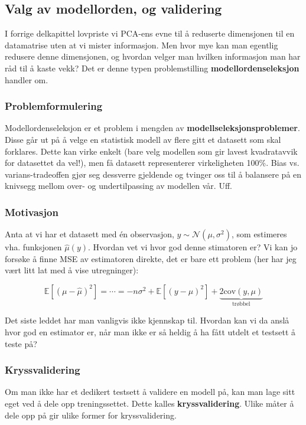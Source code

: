 \subsection{Valg av modellorden, og validering}
I forrige delkapittel lovpriste vi PCA-ens evne til å reduserte dimensjonen til en datamatrise uten at vi mister informasjon. Men hvor mye kan man egentlig redusere denne dimensjonen, og hvordan velger man hvilken informasjon man har råd til å kaste vekk? Det er denne typen problemstilling \textbf{modellordenseleksjon} handler om.

\subsubsection{Problemformulering}
Modellordenseleksjon er et problem i mengden av \textbf{modellseleksjonsproblemer}. Disse går ut på å velge en statistisk modell av flere gitt et datasett som skal forklares. Dette kan virke enkelt (bare velg modellen som gir lavest kvadratavvik for datasettet da vel!), men få datasett representerer virkeligheten 100\%. Bias vs. varians-tradeoffen gjør seg dessverre gjeldende og tvinger oss til å balansere på en knivsegg mellom over- og undertilpassing av modellen vår. Uff.

\subsubsection{Motivasjon}
Anta at vi har et datasett med én observasjon, $y \sim \mathcal{N}(\mu, \sigma^2)$, som estimeres vha. funksjonen $\hat{\mu} (y)$. Hvordan vet vi hvor god denne stimatoren er? Vi kan jo forsøke å finne MSE av estimatoren direkte, det er bare ett problem (her har jeg vært litt lat med å vise utregninger):

\begin{equation}
\mathbb{E} [(\mu - \hat{\mu})^2] = \cdots = -n \sigma^2 + \mathbb{E} [(y - \mu)^2] + \underbrace{2 \textrm{cov}(y, \mu)}_{\textrm{trøbbel}}
\end{equation}

Det siste leddet har man vanligvis ikke kjennskap til. Hvordan kan vi da anslå hvor god en estimator er, når man ikke er så heldig å ha fått utdelt et testsett å teste på?

\subsubsection{Kryssvalidering}
Om man ikke har et dedikert testsett å validere en modell på, kan man lage sitt eget ved å dele opp treningssettet. Dette kalles \textbf{kryssvalidering}. Ulike måter å dele opp på gir ulike former for kryssvalidering.

